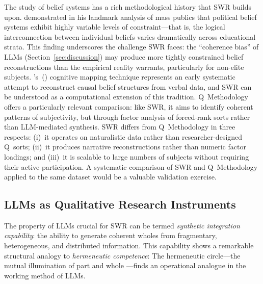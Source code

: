 \documentclass[11pt,a4paper]{article}
\theoremstyle{definition}
\theoremstyle{plain}
\theoremstyle{remark}
\begin{document}
The study of belief systems has a rich methodological history that SWR builds upon. \citet{Converse1964} demonstrated in his landmark analysis of mass publics that political belief systems exhibit highly variable levels of constraint---that is, the logical interconnection between individual beliefs varies dramatically across educational strata. This finding underscores the challenge SWR faces: the ``coherence bias'' of LLMs (Section~\ref{sec:discussion}) may produce more tightly constrained belief reconstructions than the empirical reality warrants, particularly for non-elite subjects. \citeauthor{Axelrod1976}'s~(\citeyear{Axelrod1976}) cognitive mapping technique represents an early systematic attempt to reconstruct causal belief structures from verbal data, and SWR can be understood as a computational extension of this tradition. Q~Methodology \citep{Stephenson1953,Watts2012} offers a particularly relevant comparison: like SWR, it aims to identify coherent patterns of subjectivity, but through factor analysis of forced-rank sorts rather than LLM-mediated synthesis. SWR differs from Q~Methodology in three respects: (i)~it operates on naturalistic data rather than researcher-designed Q~sorts; (ii)~it produces narrative reconstructions rather than numeric factor loadings; and (iii)~it is scalable to large numbers of subjects without requiring their active participation. A systematic comparison of SWR and Q~Methodology applied to the same dataset would be a valuable validation exercise.

\subsection{LLMs as Qualitative Research Instruments}

The property of LLMs crucial for SWR can be termed \emph{synthetic integration capability}: the ability to generate coherent wholes from fragmentary, heterogeneous, and distributed information. This capability shows a remarkable structural analogy to \emph{hermeneutic competence}: The hermeneutic circle---the mutual illumination of part and whole \citep{Gadamer1960}---finds an operational analogue in the working method of LLMs.
\end{document}
